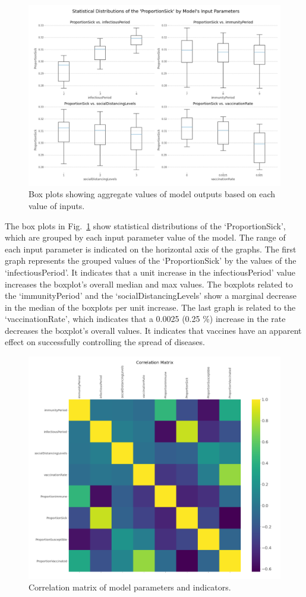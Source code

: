 \documentclass[smallextended]{svjour3}       %
\begin{document}
\begin{figure}
	\centering
	\includegraphics[width=0.6\linewidth]{figures/boxplots.png}
	\caption{Box plots showing aggregate values of model outputs based on each value of inputs.\label{fig:boxplots}}
\end{figure}


The box plots in Fig.~\ref{fig:boxplots} show statistical distributions of the ‘ProportionSick’, which are grouped by each input parameter value of the model. The range of each input parameter is indicated on the horizontal axis of the graphs. The first graph represents the grouped values of the ‘ProportionSick’ by the values of the ‘infectiousPeriod’. It indicates that a unit increase in the infectiousPeriod’ value increases the boxplot’s overall median and max values. The boxplots related to the ‘immunityPeriod’ and the ‘socialDistancingLevels’ show a marginal decrease in the median of the boxplots per unit increase. The last graph is related to the ‘vaccinationRate’, which indicates that a 0.0025 (0.25 \%) increase in the rate decreases the boxplot’s overall values. It indicates that vaccines have an apparent effect on successfully controlling the spread of diseases.


\begin{figure}
	\centering
	\includegraphics[width=0.7\linewidth]{figures/correlations.png}
	\caption{Correlation matrix of model parameters and indicators.\label{fig:correlations}}
\end{figure}
\end{document}
